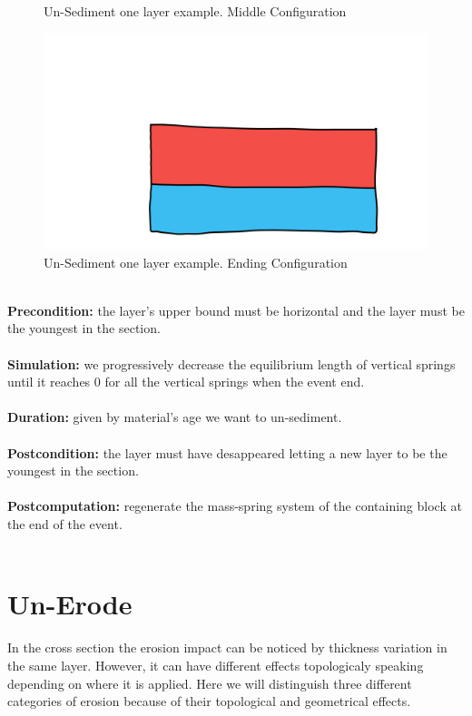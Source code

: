 \documentclass[12pt, a4paper]{report} %
\begin{document}
\begin{figure}[h]
\begin{minipage}[c]{.50\linewidth}
	\caption{Un-Sediment one layer example. Middle Configuration}
    \end{minipage}
     \hfill%
    \begin{minipage}[c]{.50\linewidth}
        \centering
        \includegraphics[scale=0.2]{unSedimentDescription2.png}
	\caption{Un-Sediment one layer example. Ending Configuration}
    \end{minipage}
\end{figure}\\
\textbf{Precondition:} the layer's upper bound must be horizontal and the layer must be the youngest in the section.\\\\
\textbf{Simulation:} we progressively decrease the equilibrium length of vertical springs until it reaches $0$ for all the vertical springs when the event end.\\\\
\textbf{Duration:} given by material's age we want to un-sediment.\\\\
\textbf{Postcondition:} the layer must have desappeared letting a new layer to be the youngest 
in the section.\\\\
\textbf{Postcomputation:} regenerate the mass-spring system of the containing block at the end of the event.\\\\

\section{Un-Erode}

In the cross section the erosion impact can be noticed by thickness variation in the same layer. However, it can have different effects topologicaly speaking depending on where it is applied. Here we will distinguish three different categories of erosion because of their topological and geometrical effects.\\\\
\end{document}
